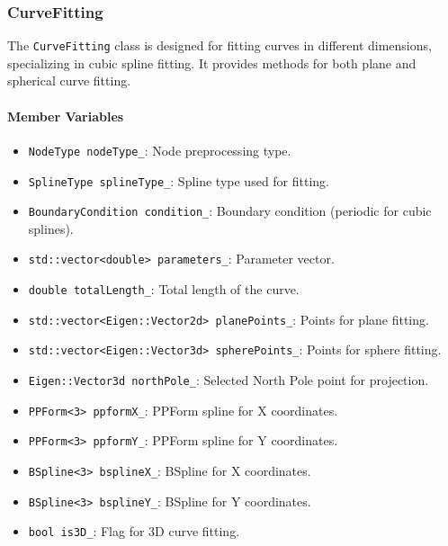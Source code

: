 \documentclass[a4paper]{article}
\begin{document}
\begin{sloppypar}
\subsubsection{CurveFitting}
The \verb|CurveFitting| class is designed for fitting curves in different dimensions, specializing in cubic spline fitting. It provides methods for both plane and spherical curve fitting.

\paragraph*{Member Variables}
\begin{itemize}
  \item \verb|NodeType nodeType_|: Node preprocessing type.
  \item \verb|SplineType splineType_|: Spline type used for fitting.
  \item \verb|BoundaryCondition condition_|: Boundary condition (periodic for cubic splines).
  \item \verb|std::vector<double> parameters_|: Parameter vector.
  \item \verb|double totalLength_|: Total length of the curve.
  \item \verb|std::vector<Eigen::Vector2d> planePoints_|: Points for plane fitting.
  \item \verb|std::vector<Eigen::Vector3d> spherePoints_|: Points for sphere fitting.
  \item \verb|Eigen::Vector3d northPole_|: Selected North Pole point for projection.
  \item \verb|PPForm<3> ppformX_|: PPForm spline for X coordinates.
  \item \verb|PPForm<3> ppformY_|: PPForm spline for Y coordinates.
  \item \verb|BSpline<3> bsplineX_|: BSpline for X coordinates.
  \item \verb|BSpline<3> bsplineY_|: BSpline for Y coordinates.
  \item \verb|bool is3D_|: Flag for 3D curve fitting.
\end{itemize}


\end{sloppypar}
\end{document}
